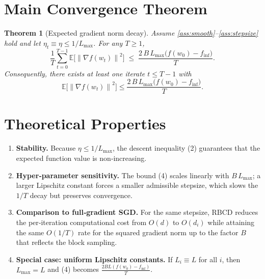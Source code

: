 \documentclass{article}
\newtheorem{theorem}{Theorem}
\newcommand{\E}{\mathbb{E}}
\newcommand{\norm}[1]{\left\|#1\right\|}
\newcommand{\grad}{\nabla}
\begin{document}
\section*{Main Convergence Theorem}
\begin{theorem}[Expected gradient norm decay]\label{thm:main}
Assume \ref{ass:smooth}--\ref{ass:stepsize} hold and let
$\eta_t\equiv\eta\le 1/L_{\max}$.  For any $T\ge1$,
\[
\frac1T\sum_{t=0}^{T-1}\E\!\bigl[\norm{\grad f(w_t)}^{2}\bigr]
\;\le\;
\frac{2\,B\,L_{\max}\bigl(f(w_0)-f_{\inf}\bigr)}{T}.
\tag{4}
\]
Consequently, there exists at least one iterate $t\le T-1$ with
\[
\E\!\bigl[\norm{\grad f(w_t)}^{2}\bigr]\le
\frac{2\,B\,L_{\max}\bigl(f(w_0)-f_{\inf}\bigr)}{T}.
\]
\end{theorem}

\section*{Theoretical Properties}
\begin{enumerate}[label=\arabic*)]
\item \textbf{Stability.} Because $\eta\le 1/L_{\max}$, the descent
inequality (2) guarantees that the expected function value is non‑increasing.
\item \textbf{Hyper‑parameter sensitivity.} The bound (4) scales linearly
with $B\,L_{\max}$; a larger Lipschitz constant forces a smaller admissible stepsize,
which slows the $1/T$ decay but preserves convergence.
\item \textbf{Comparison to full‑gradient SGD.} For the same stepsize,
RBCD reduces the per‑iteration computational cost from $O(d)$ to $O(d_i)$
while attaining the same $O(1/T)$ rate for the squared gradient norm up to the factor $B$ that reflects the block sampling.
\item \textbf{Special case: uniform Lipschitz constants.} If $L_i\equiv L$ for all $i$,
then $L_{\max}=L$ and (4) becomes $\frac{2BL(f(w_0)-f_{\inf})}{T}$.
\end{enumerate}
\end{document}
